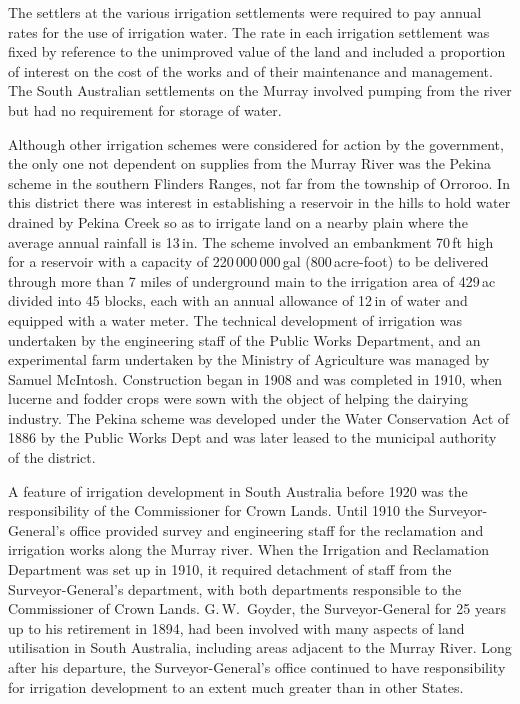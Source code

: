 The settlers at the various irrigation settlements were required to
pay annual rates for the use of irrigation water.  The rate in each
irrigation settlement was fixed by reference to the unimproved value
of the land and included a proportion of interest on the cost of the
works and of their maintenance and management.  The South Australian
settlements on the Murray involved pumping from the river but had no
requirement for storage of water.

Although other irrigation schemes were considered for action by the
government, the only one not dependent on supplies from the Murray
River was the Pekina scheme in the southern Flinders Ranges, not far
from the township of Orroroo.  In this district there was interest in
establishing a reservoir in the hills to hold water drained by Pekina
Creek so as to irrigate land on a nearby plain where the average
annual rainfall is 13\,in.  The scheme involved an embankment 70\,ft
high for a reservoir with a capacity of 220\,000\,000\,gal
(800\,acre-foot) to be delivered through more than 7 miles of
underground main to the irrigation area of 429\,ac divided into 45
blocks, each with an annual allowance of 12\,in of water and equipped
with a water meter.  The technical development of irrigation was
undertaken by the engineering staff of the Public Works Department,
and an experimental farm undertaken by the Ministry of Agriculture was
managed by Samuel McIntosh.  Construction began in 1908 and was
completed in 1910, when lucerne and fodder crops were sown with the
object of helping the dairying industry.  The Pekina scheme was developed under the Water Conservation
Act of 1886 by the Public Works Dept and was later leased to the
municipal authority of the district.

A feature of irrigation development in South Australia before 1920 was
the responsibility of the Commissioner for Crown Lands.  Until 1910
the Surveyor-General's office provided survey and engineering staff
for the reclamation and irrigation works along the Murray river.  When
the Irrigation and Reclamation Department was set up in 1910, it
required detachment of staff from the Surveyor-General's department,
with both departments responsible to the Commissioner of Crown Lands.
G.\,W.~Goyder, the Surveyor-General for 25 years up to his retirement
in 1894, had been involved with many aspects of land utilisation in
South Australia, including areas adjacent to the Murray River.  Long
after his departure, the Surveyor-General's office continued to have
responsibility for irrigation development to an extent much greater
than in other States.

